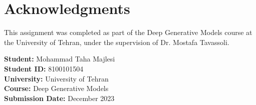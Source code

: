 \documentclass[12pt,a4paper]{article}
\begin{document}
\section*{Acknowledgments}

This assignment was completed as part of the Deep Generative Models course at the University of Tehran, under the supervision of Dr. Mostafa Tavassoli.

\vspace{1cm}

\noindent\textbf{Student:} Mohammad Taha Majlesi\\
\textbf{Student ID:} 8100101504\\
\textbf{University:} University of Tehran\\
\textbf{Course:} Deep Generative Models\\
\textbf{Submission Date:} December 2023
\end{document}
